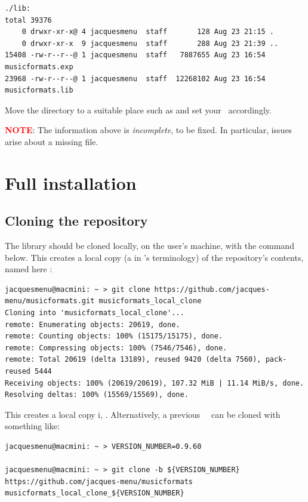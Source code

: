 \begin{lstlisting}[language=Terminal]
./lib:
total 39376
    0 drwxr-xr-x@ 4 jacquesmenu  staff       128 Aug 23 21:15 .
    0 drwxr-xr-x  9 jacquesmenu  staff       288 Aug 23 21:39 ..
15408 -rw-r--r--@ 1 jacquesmenu  staff   7887655 Aug 23 16:54 musicformats.exp
23968 -rw-r--r--@ 1 jacquesmenu  staff  12268102 Aug 23 16:54 musicformats.lib
\end{lstlisting}

Move the  directory to a suitable place such as  and set your  \environmentVariable\ accordingly.

\textcolor{red}{\bf NOTE}: The information above is {\it incomplete}, to be fixed. In particular, issues arise about a missing  file.


\chapter{Full installation}

\section{Cloning the repository}

The library should be cloned locally, on the user's machine, with the command below. This creates a local copy (a  in \git's terminology) of the repository's contents, named here :
\begin{lstlisting}[language=Terminal]
jacquesmenu@macmini: ~ > git clone https://github.com/jacques-menu/musicformats.git musicformats_local_clone
Cloning into 'musicformats_local_clone'...
remote: Enumerating objects: 20619, done.
remote: Counting objects: 100% (15175/15175), done.
remote: Compressing objects: 100% (7546/7546), done.
remote: Total 20619 (delta 13189), reused 9420 (delta 7560), pack-reused 5444
Receiving objects: 100% (20619/20619), 107.32 MiB | 11.14 MiB/s, done.
Resolving deltas: 100% (15569/15569), done.
\end{lstlisting}

This creates a local copy i, \masterBranch.
Alternatively, a previous \mf\ \version\ can be cloned with something like:
\begin{lstlisting}[language=Terminal]
jacquesmenu@macmini: ~ > VERSION_NUMBER=0.9.60

jacquesmenu@macmini: ~ > git clone -b ${VERSION_NUMBER} https://github.com/jacques-menu/musicformats musicformats_local_clone_${VERSION_NUMBER}
\end{lstlisting}


